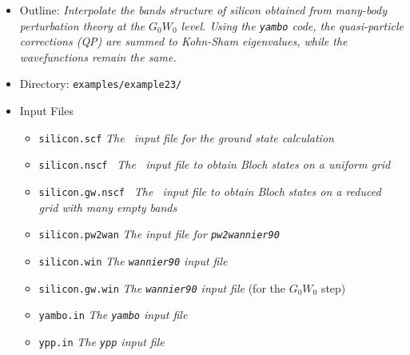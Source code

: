 \documentclass[a4paper,11pt,twoside]{article}
\begin{document}
\begin{itemize}
\item{Outline: \it{Interpolate the bands structure of silicon obtained from many-body perturbation theory at the $G_0W_0$ level. Using the {\tt yambo} code, the quasi-particle corrections (QP) are summed to Kohn-Sham eigenvalues, while the wavefunctions remain the same. }}
\item{Directory: {\tt examples/example23/}}
\item{Input Files}
\begin{itemize}
\item{ {\tt silicon.scf}  {\it The \pwscf\ input file for the ground state
    calculation}} 
\item{ {\tt silicon.nscf }  {\it The \pwscf\ input file to obtain Bloch
    states on a uniform grid}}
\item{ {\tt silicon.gw.nscf }  {\it The \pwscf\ input file to obtain Bloch
    states on a reduced grid with many empty bands}}  
\item{ {\tt silicon.pw2wan}  {\it The input file for {\tt pw2wannier90}}}
\item{ {\tt silicon.win}  {\it The {\tt wannier90} input file}}
\item{ {\tt silicon.gw.win}  {\it The {\tt wannier90} input file} (for the $G_0W_0$ step)}
\item{ {\tt yambo.in}  {\it The {\tt yambo} input file}}
\item{ {\tt ypp.in}  {\it The {\tt ypp} input file}}
\end{itemize}
\end{itemize}
\end{document}
